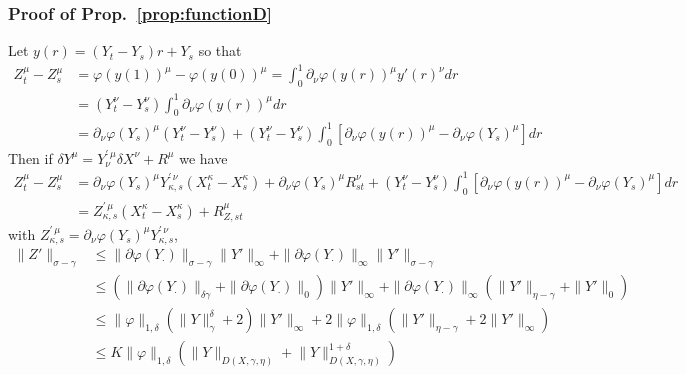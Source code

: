 \documentclass[a4paper,12pt,reqno]{amsproc}
\newcommand{\der}{\delta\!}
\newcommand{\norm}[1]{\lVert #1\rVert}
\begin{document}
\subsubsection{Proof of Prop.~\ref{prop:functionD}}
\label{sec:proof_of_function_D}
Let
$y(r) = (Y_t-Y_s)r+Y_s$
so that
\begin{equation*}
  \begin{split}
Z^\mu_t-Z^\mu_s & = \varphi(y(1))^\mu-\varphi(y(0))^\mu = \int_0^1
 \partial_\nu \varphi(y(r))^\mu y'(r)^\nu dr 
\\ & =  (Y^\nu_t-Y^\nu_s) \int_0^1
\partial_\nu \varphi(y(r))^\mu dr 
\\ & =  \partial_\nu\varphi(Y_s)^\mu (Y^\nu_t-Y^\nu_s) + (Y^\nu_t-Y^\nu_s) \int_0^1 \left[\partial_\nu \varphi(y(r))^\mu-\partial_\nu \varphi(Y_s)^\mu\right] dr 
  \end{split}
\end{equation*}
Then if $\der Y^\mu =  Y^{\prime\,\mu}_{\nu}  \der X^\nu + R^\mu$ we have
\begin{equation}
\label{eq:decomposition_of_Z}
  \begin{split}
Z^\mu_t-Z^\mu_s &  =  \partial_\nu \varphi(Y_s)^\mu Y^{\prime\,\nu}_{\kappa,s} (X^\kappa_t-X^\kappa_s) 
+  \partial_\nu\varphi(Y_s)^\mu R^\nu_{st} 
+ (Y^\nu_t-Y^\nu_s) \int_0^1 \left[\partial_\nu \varphi(y(r))^\mu-\partial_\nu
  \varphi(Y_s)^\mu\right] dr 
\\ & =  Z^{\prime\,\mu}_{\kappa,s} (X^\kappa_t-X^\kappa_s) + R^{\mu}_{Z,st}
  \end{split}
\end{equation}
with $Z^{\prime\,\mu}_{\kappa,s} = \partial_\nu \varphi(Y_s)^\mu
Y^{\prime\,\nu}_{\kappa,s}$, %
\begin{equation*}
  \begin{split}
\|Z'\|_{\sigma-\gamma} &\le \|\partial \varphi(Y_\cdot)\|_{\sigma-\gamma} \|Y'\|_\infty+
\|\partial \varphi(Y_\cdot)\|_{\infty} \|Y'\|_{\sigma-\gamma}
\\ &\le (\|\partial \varphi(Y_\cdot)\|_{\delta \gamma}+\|\partial \varphi(Y_\cdot)\|_{0}) \|Y'\|_\infty+
\|\partial \varphi(Y_\cdot)\|_{\infty} (\|Y'\|_{\eta-\gamma}+\|Y'\|_{0})
\\ &\le \|\varphi\|_{1,\delta}(\|Y\|^\delta_{\gamma}+2) \|Y'\|_\infty+
2 \|\varphi\|_{1,\delta} (\|Y'\|_{\eta-\gamma}+2\|Y'\|_{\infty})
\\ & \le K \|\varphi\|_{1,\delta}
(\norm{Y}_{D(X,\gamma,\eta)}+\norm{Y}_{D(X,\gamma,\eta)}^{1+\delta})
  \end{split}
\end{equation*}
\end{document}
